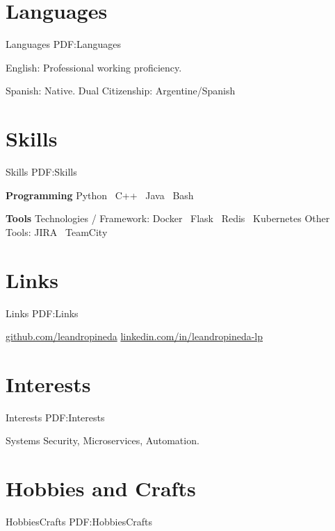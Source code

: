\documentclass[letterpaper,MMMyyyy,nonstop]{simpleresumecv}
\begin{document}
\begin{body}

\section
{Languages}
{Languages}
{PDF:Languages}

\BulletItem
English: Professional working proficiency.

\GapNoBreak
\BulletItem
Spanish: Native.
\GapNoBreak
\BulletItem
Dual Citizenship: Argentine/Spanish


\section
{Skills}
{Skills}
{PDF:Skills}

\textbf{Programming}
\BulletItem Python \SubBulletSymbol\, C++ \SubBulletSymbol\, Java \SubBulletSymbol\, Bash

\textbf{Tools}
\BulletItem
Technologies / Framework: Docker \SubBulletSymbol\, Flask \SubBulletSymbol\, Redis \SubBulletSymbol\, Kubernetes
\BulletItem
Other Tools: JIRA \SubBulletSymbol\, TeamCity



\section
{Links}
{Links}
{PDF:Links}

\BulletItem
\href{https://github.com/leandropineda}{github.com/leandropineda}
\BulletItem
\href{https://www.linkedin.com/in/leandropineda-lp}{linkedin.com/in/leandropineda-lp}


\section
{Interests}
{Interests}
{PDF:Interests}

Systems Security, Microservices, Automation.


\section
{Hobbies \newline
	and Crafts}
{HobbiesCrafts}
{PDF:HobbiesCrafts}


\end{body}
\end{document}
